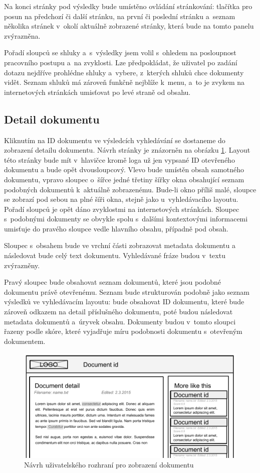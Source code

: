 Na konci stránky pod výsledky bude umístěno ovládání stránkování: tlačítka pro posun na předchozí či další stránku, na první či poslední stránku a~seznam několika stránek v~okolí aktuálně zobrazené stránky, která bude na tomto panelu zvýrazněna.

Pořadí sloupců se shluky a~s~výsledky jsem volil s~ohledem na posloupnost pracovního postupu a~na zvyklosti. Lze předpokládat, že uživatel po zadání dotazu nejdříve prohlédne shluky a~vybere, z~kterých shluků chce dokumenty vidět. Seznam shluků má zároveň funkčně nejblíže k~menu, a~to je zvykem na internetových stránkách umisťovat po levé straně od obsahu.

\subsection{Detail dokumentu}
Kliknutím na ID dokumentu ve výsledcích vyhledávání se dostaneme do zobrazení detailu dokumentu. Návrh stránky je znázorněn na obrázku \ref{fig:DetailLayout}. Layout této stránky bude mít v~hlavičce kromě loga už jen vypsané ID otevřeného dokumentu a bude opět dvousloupcový. Vlevo bude umístěn obsah samotného dokumentu, vpravo sloupec o~šířce jedné třetiny šířky okna obsahující seznam podobných dokumentů k~aktuálně zobrazenému. Bude-li okno příliš malé, sloupce se zobrazí pod sebou na plné šíři okna, stejně jako u~vyhledávacího layoutu. Pořadí sloupců je opět dáno zvyklostmi na internetových stránkách. Sloupec s~podobnými dokumenty se obvykle spolu s~dalšími kontextovými informacemi umisťuje  do pravého sloupce vedle hlavního obsahu, případně pod obsah.

Sloupec s~obsahem bude ve vrchní části zobrazovat metadata dokumentu a následovat bude celý text dokumentu. Vyhledávané fráze budou v~textu zvýrazněny. 

Pravý sloupec bude obsahovat seznam dokumentů, které jsou podobné dokumentu právě otevřenému. Seznam bude strukturován podobně jako seznam výsledků ve vyhledávacím layoutu: bude obsahovat ID dokumentu, které bude zároveň odkazem na detail příslušného dokumentu, poté budou následovat metadata dokumentů a~úryvek obsahu. Dokumenty budou v~tomto sloupci řazeny podle skóre, které vyjadřuje míru podobnosti dokumentu s~otevřeným dokumentem.

\begin{figure}[h]
\begin{center}
\includegraphics[width=13cm]{DetailLayout}
\caption{Návrh uživatelského rozhraní pro zobrazení dokumentu}
\label{fig:DetailLayout}
\end{center}
\end{figure}